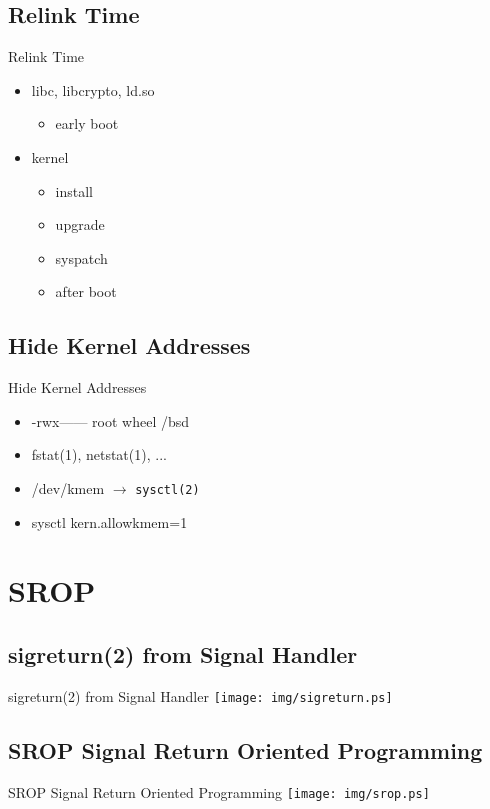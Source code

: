 \documentclass[14pt]{beamer}
\begin{document}
\subsection{Relink Time}
\begin{frame}{Relink Time}
\begin{itemize}
    \item libc, libcrypto, ld.so
    \begin{itemize}
	\item early boot
    \end{itemize}
    \item kernel
    \begin{itemize}
	\item install
	\item upgrade
	\item syspatch
	\item after boot
    \end{itemize}
\end{itemize}
\end{frame}

\subsection{Hide Kernel Addresses}
\begin{frame}{Hide Kernel Addresses}
\begin{itemize}
    \item -rwx------ root wheel /bsd
    \item fstat(1), netstat(1), ...
    \item /dev/kmem $\rightarrow$ \texttt{sysctl(2)}
    \item sysctl kern.allowkmem=1
\end{itemize}
\end{frame}

\section{SROP}

\subsection{sigreturn(2) from Signal Handler}
\begin{frame}{sigreturn(2) from Signal Handler}
\texttt{[image: img/sigreturn.ps]}
\end{frame}

\subsection{SROP Signal Return Oriented Programming}
\begin{frame}{SROP Signal Return Oriented Programming}
\texttt{[image: img/srop.ps]}
\end{frame}
\end{document}
